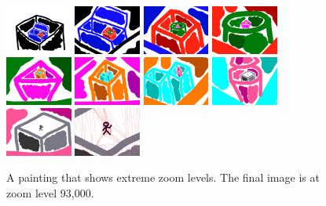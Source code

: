 \documentclass[review]{acmsiggraph}
\begin{document}
\begin{figure}
    \centering
        \includegraphics[width=0.195\textwidth]{images/zoom61}
        \includegraphics[width=0.195\textwidth]{images/zoom62}
        \includegraphics[width=0.195\textwidth]{images/zoom63}
        \includegraphics[width=0.195\textwidth]{images/zoom64}
        \includegraphics[width=0.195\textwidth]{images/zoom65}
        \includegraphics[width=0.195\textwidth]{images/zoom66}
        \includegraphics[width=0.195\textwidth]{images/zoom67}
        \includegraphics[width=0.195\textwidth]{images/zoom68}
        \includegraphics[width=0.195\textwidth]{images/zoom69}
        \includegraphics[width=0.195\textwidth]{images/zoom71}
    \caption{A painting that shows extreme zoom levels.  The final image is at zoom level 93,000.}
    \label{fig:boxes}
\end{figure}
\end{document}
